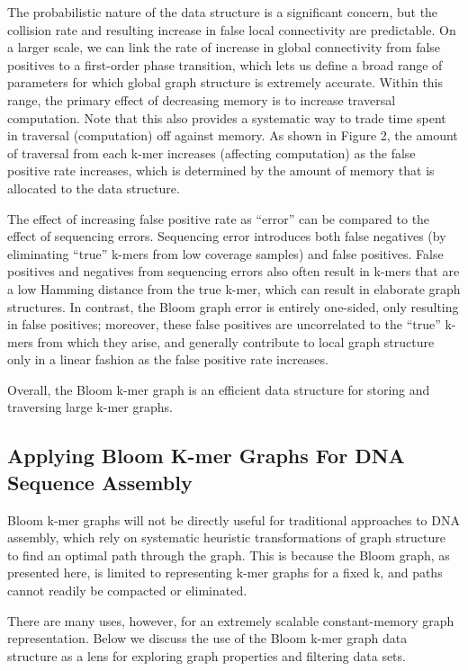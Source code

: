 \documentclass[12pt]{article} \usepackage{simplemargins}
\begin{document}
The probabilistic nature of the data structure is a significant
concern, but the collision rate and resulting increase in false local
connectivity are predictable.  On a larger scale, we can link the
rate of increase in global connectivity from false positives to a
first-order phase transition, which lets us define a broad range of
parameters for which global graph structure is extremely accurate.
Within this range, the primary effect of decreasing memory is to increase
traversal computation.  Note that this also provides a systematic way
to trade time spent in traversal (computation) off against memory. As shown 
in Figure 2, the amount of traversal from each k-mer increases 
(affecting computation) as the false positive rate increases, which 
is determined by the amount of memory that is allocated to the data 
structure.

The effect of increasing false positive rate as ``error'' can be
compared to the effect of sequencing errors.  Sequencing error
introduces both false negatives (by eliminating ``true'' k-mers from
low coverage samples) and false positives.  False positives and
negatives from sequencing errors also often result in k-mers that are
a low Hamming distance from the true k-mer, which can result in
elaborate graph structures.  In contrast, the Bloom graph error is
entirely one-sided, only resulting in false positives; moreover, these
false positives are uncorrelated to the ``true'' k-mers from which
they arise, and generally contribute to local graph structure only 
in a linear fashion as the false positive rate increases.

Overall, the Bloom k-mer graph is an efficient data structure for
storing and traversing large k-mer graphs.

\subsection{Applying Bloom K-mer Graphs For DNA Sequence Assembly}
Bloom k-mer graphs will not be directly useful for traditional
approaches to DNA assembly, which rely on systematic heuristic
transformations of graph structure to find an optimal path through the
graph.  This is because the Bloom graph, as presented here, is limited
to representing k-mer graphs for a fixed k, and paths cannot readily
be compacted or eliminated.

There are many uses, however, for an extremely scalable
constant-memory graph representation.  Below we discuss the use of the
Bloom k-mer graph data structure as a lens for exploring graph
properties and filtering data sets.
\end{document}
